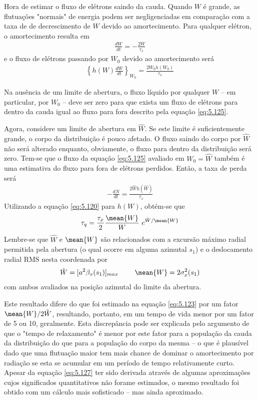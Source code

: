 Hora de estimar o fluxo de elétrons saindo da cauda. Quando $W$ é grande, as flutuações "normais" de energia podem ser negligenciadas em comparação com a taxa de de decrescimento de $W$ devido ao amortecimento. Para qualquer elétron, o amortecimento resulta em
\begin{align}
	\frac{dW}{dt} = -\frac{2W}{\tau_x}
\end{align}
e o fluxo de elétrons passando por $W_0$ devido ao amortecimento será
\begin{align}
	\left\{h(W) \frac{dW}{dt}\right\}_{W_0} = \frac{2W_0 h(W_0)}{\tau_x}\label{eq:5.125}
\end{align}

Na ausência de um limite de abertura, o fluxo líquido por qualquer $W$ -- em particular, por $W_0$ -- deve ser zero para que exista um fluxo de elétrons para dentro da cauda igual ao fluxo para fora descrito pela equação \eqref{eq:5.125}.

Agora, considere um limite de abertura em $\hat{W}$. Se este limite é suficientemente grande, o corpo da distribuição é pouco afetado. O fluxo saindo do corpo por $\hat{W}$ não será alterado enquanto, obviamente, o fluxo para dentro da distribuição será zero. Tem-se que o fluxo da equação \eqref{eq:5.125} avaliado em $W_0= \hat{W}$ também é uma estimativa do fluxo para fora de elétrons perdidos. Então, a taxa de perda será
\begin{align}
	-\frac{dN}{dt} = \frac{2\hat{W} h(\hat{W})}{\tau_x}
\end{align}
Utilizando a equação \eqref{eq:5.120} para $h(W)$, obtém-se que
\begin{align}
	\tau_q = \frac{\tau_x}{2} \frac{\mean{W}}{W}\ e^{\hat{W}/\mean{W}}\label{eq:5.127}
\end{align}
Lembre-se que $\hat{W}$ e $\mean{W}$ são relacionados com a excursão máximo radial permitida pela abertura (o qual ocorre em alguma azimutal $s_1$) e o deslocamento radial RMS nesta coordenada por
\begin{align}
	\hat{W} = [a^2 \beta_x(s_1)]_{max}\ \ \ \ \ \ \ \mean{W} = 2\sigma_x^2(s_1)
\end{align}
com ambos avaliados na posição azimutal do limite da abertura.

Este resultado difere do que foi estimado na equação \eqref{eq:5.123} por um fator $\mean{W}/2\hat{W}$, resultando, portanto, em um tempo de vida menor por um fator de 5 ou 10, geralmente. Esta discrepância pode ser explicada pelo argumento de que o "tempo de relaxamento" é menor por este fator para a população da cauda da distribuição do que para a população do corpo da mesma -- o que é plausível dado que uma flutuação maior tem mais chance de dominar o amortecimento por radiação se esta se acumular em um período de tempo relativamente curto. Apesar da equação \eqref{eq:5.127} ter sido derivada através de algumas aproximações cujos significados quantitativos não forame estimados, o mesmo resultado foi obtido com um cálculo mais sofisticado -- mas ainda aproximado.

